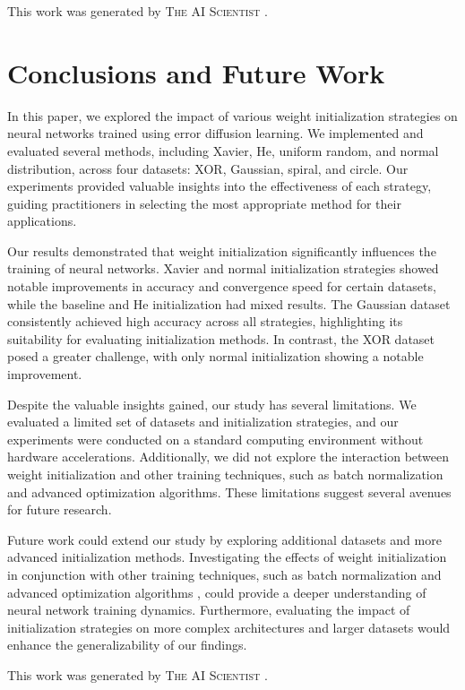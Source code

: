 \documentclass{article} %
\begin{document}
This work was generated by \textsc{The AI Scientist} \citep{lu2024aiscientist}.

\section{Conclusions and Future Work}
\label{sec:conclusion}

In this paper, we explored the impact of various weight initialization strategies on neural networks trained using error diffusion learning. We implemented and evaluated several methods, including Xavier, He, uniform random, and normal distribution, across four datasets: XOR, Gaussian, spiral, and circle. Our experiments provided valuable insights into the effectiveness of each strategy, guiding practitioners in selecting the most appropriate method for their applications.

Our results demonstrated that weight initialization significantly influences the training of neural networks. Xavier and normal initialization strategies showed notable improvements in accuracy and convergence speed for certain datasets, while the baseline and He initialization had mixed results. The Gaussian dataset consistently achieved high accuracy across all strategies, highlighting its suitability for evaluating initialization methods. In contrast, the XOR dataset posed a greater challenge, with only normal initialization showing a notable improvement.

Despite the valuable insights gained, our study has several limitations. We evaluated a limited set of datasets and initialization strategies, and our experiments were conducted on a standard computing environment without hardware accelerations. Additionally, we did not explore the interaction between weight initialization and other training techniques, such as batch normalization and advanced optimization algorithms. These limitations suggest several avenues for future research.

Future work could extend our study by exploring additional datasets and more advanced initialization methods. Investigating the effects of weight initialization in conjunction with other training techniques, such as batch normalization \citep{ba2016layer} and advanced optimization algorithms \citep{loshchilov2017adamw}, could provide a deeper understanding of neural network training dynamics. Furthermore, evaluating the impact of initialization strategies on more complex architectures and larger datasets would enhance the generalizability of our findings.

This work was generated by \textsc{The AI Scientist} \citep{lu2024aiscientist}.






\end{document}
